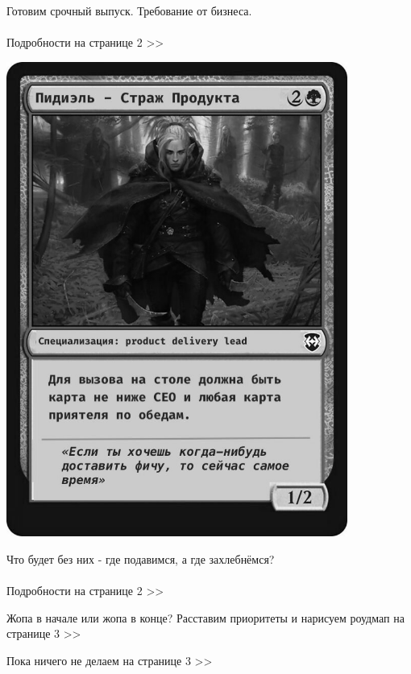 \documentclass{article}
\date{\today}
\begin{document}
\maketitle

\begin{multicols}{3}

Готовим срочный выпуск. Требование от бизнеса.
\\\\Подробности на странице 2 >>
\vspace{20mm}
\closearticle

\includegraphics[width=11.2cm]{main.jpeg}

\end{multicols}

\begin{multicols}{3}

Что будет без них - где подавимся, а где захлебнёмся?
\\\\Подробности на странице 2 >>
\vspace{8mm}
\closearticle

Жопа в начале или жопа в конце? Расставим приоритеты и нарисуем роудмап на странице 3 >>
\vspace{10mm}
\closearticle

Пока ничего не делаем на странице 3 >>
\vspace{8mm}
\closearticle

\end{multicols}
\end{document}
